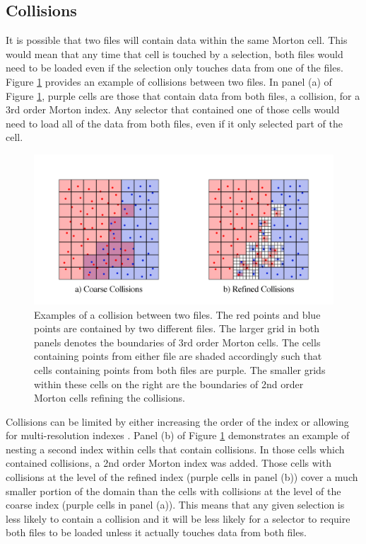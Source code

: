 \documentclass[apjl]{emulateapj}
\begin{document}
\subsection{Collisions}
It is possible that two files will contain data within the same Morton cell. This would mean that any time that cell is touched by a selection, both files would need to be loaded even if the selection only touches data from one of the files. Figure \ref{fig:collision} provides an example of collisions between two files. In panel (a) of Figure \ref{fig:collision}, purple cells are those that contain data from both files, a collision, for a 3rd order Morton index. Any selector that contained one of those cells would need to load all of the data from both files, even if it only selected part of the cell.
%
\begin{figure}[htbp]
\begin{center}
\includegraphics[width=\columnwidth,keepaspectratio]{../images/collisions.png}
\caption{Examples of a collision between two files. The red points and blue points are contained by two different files. The larger grid in both panels denotes the boundaries of 3rd order Morton cells.  The cells containing points from either file are shaded accordingly such that cells containing points from both files are purple. The smaller grids within these cells on the right are the boundaries of 2nd order Morton cells refining the collisions.}
\label{fig:collision}
\end{center}
\end{figure}
%

Collisions can be limited by either increasing the order of the index or allowing for multi-resolution indexes \citep{Sinha2006,Sinha2007}. Panel (b) of Figure \ref{fig:collision} demonstrates an example of nesting a second index within cells that contain collisions. In those cells which contained collisions, a 2nd order Morton index was added. Those cells with collisions at the level of the refined index (purple cells in panel (b)) cover a much smaller portion of the domain than the cells with collisions at the level of the coarse index (purple cells in panel (a)). This means that any given selection is less likely to contain a collision and it will be less likely for a selector to require both files to be loaded unless it actually touches data from both files.
\end{document}
